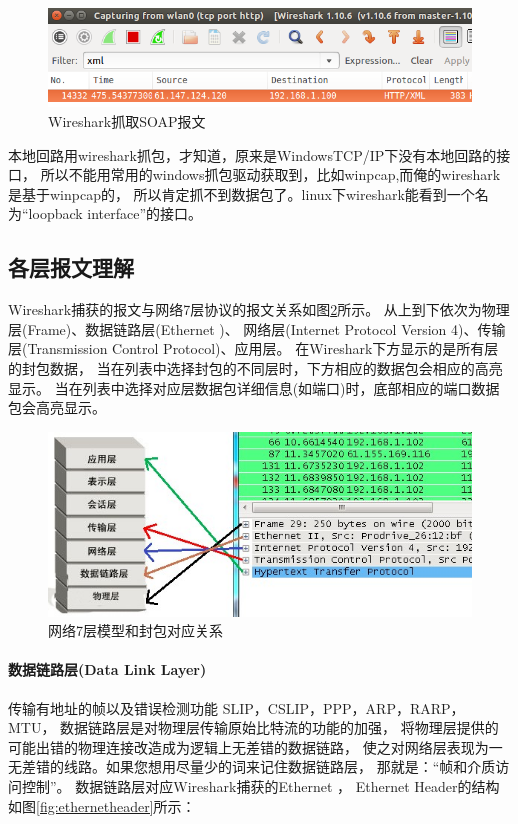 \documentclass{book}
\begin{document}
\begin{figure}[htbp]
	\centering
	\includegraphics[scale=0.6]{WiresharkCaptureSoap.png}
	\caption{Wireshark抓取SOAP报文}
	\label{fig:WiresharkCaptureSoap}
\end{figure}

本地回路用wireshark抓包，才知道，原来是WindowsTCP/IP下没有本地回路的接口，
所以不能用常用的windows抓包驱动获取到，比如winpcap,而俺的wireshark是基于winpcap的，
所以肯定抓不到数据包了。linux下wireshark能看到一个名为“loopback interface”的接口。

\subsection{各层报文理解}


Wireshark捕获的报文与网络7层协议的报文关系如图\ref{fig:SevenModelInWireshark}所示。
从上到下依次为物理层(Frame)、数据链路层(Ethernet \uppercase\expandafter{})、
网络层(Internet Protocol Version 4)、传输层(Transmission Control Protocol)、应用层。
在Wireshark下方显示的是所有层的封包数据，
当在列表中选择封包的不同层时，下方相应的数据包会相应的高亮显示。
当在列表中选择对应层数据包详细信息(如端口)时，底部相应的端口数据包会高亮显示。

\begin{figure}[htbp]
	\centering
	\includegraphics[scale=0.6]{SevenModelInWireshark.jpg}
	\caption{网络7层模型和封包对应关系}
	\label{fig:SevenModelInWireshark}
\end{figure}

\paragraph{数据链路层(Data Link Layer)}传输有地址的帧以及错误检测功能 SLIP，CSLIP，PPP，ARP，RARP，MTU，
数据链路层是对物理层传输原始比特流的功能的加强，
将物理层提供的可能出错的物理连接改造成为逻辑上无差错的数据链路，
使之对网络层表现为一无差错的线路。如果您想用尽量少的词来记住数据链路层，
那就是：“帧和介质访问控制”。
数据链路层对应Wireshark捕获的Ethernet \uppercase\expandafter{}，
Ethernet \uppercase\expandafter{} Header的结构如图\ref{fig:ethernetheader}所示：
\end{document}
